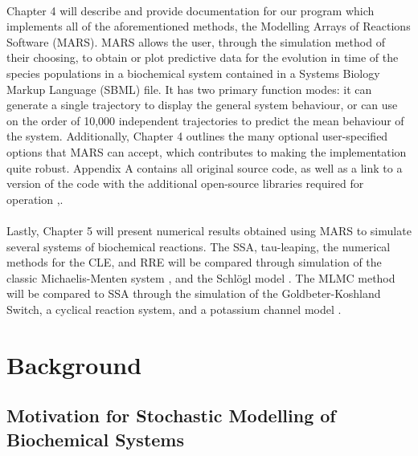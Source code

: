\documentclass[ugrad,lot,lof,openright,11pt,oneside,onehalfspace]{RUthesis}
\begin{document}
	\\
	Chapter 4 will describe and provide documentation for our program which implements all of the aforementioned methods, the Modelling Arrays of Reactions Software (MARS). MARS allows the user, through the simulation method of their choosing, to obtain or plot predictive data for the evolution in time of the species populations in a biochemical system contained in a Systems Biology Markup Language (SBML) file. It has two primary function modes: it can generate a single trajectory to display the general system behaviour, or can use on the order of 10,000 independent trajectories to predict the mean behaviour of the system. Additionally, Chapter 4 outlines the many optional user-specified options that MARS can accept, which contributes to making the implementation quite robust. Appendix A contains all original source code, as well as a link to a version of the code with the additional open-source libraries required for operation \cite{sbml_toolbox},\cite{libsbml}.\\
	\\
	Lastly, Chapter 5 will present numerical results obtained using MARS to simulate several systems of biochemical reactions. The SSA, tau-leaping, the numerical methods for the CLE, and RRE will be compared through simulation of the classic Michaelis-Menten system \cite{sim_chem_reactions}, and the Schl\"{o}gl model \cite{schlogl}. The MLMC method will be compared to SSA through the simulation of the Goldbeter-Koshland Switch, a cyclical reaction system, and a potassium channel model \cite{chem_phys_models}.

\chapter[Background]{Background}

	\section{Motivation for Stochastic Modelling of Biochemical Systems}
\end{document}
